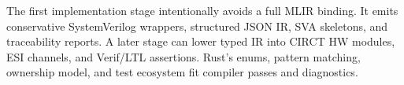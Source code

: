 The first implementation stage intentionally avoids a full MLIR binding. It emits conservative SystemVerilog wrappers, structured JSON IR, SVA skeletons, and traceability reports. A later stage can lower typed IR into CIRCT HW modules, ESI channels, and Verif/LTL assertions. Rust's enums, pattern matching, ownership model, and test ecosystem fit compiler passes and diagnostics.
